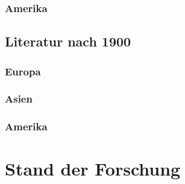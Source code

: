 \documentclass[12pt,ngerman,parskip=half]{scrreprt}
\begin{document}
\subsubsection{Amerika}

\blindtext 

\blindtext

\blindtext

\subsection{Literatur nach 1900}

\subsubsection{Europa}

\blindtext 

\blindtext

\blindtext

\subsubsection{Asien}

\blindtext 

\blindtext

\blindtext

\subsubsection{Amerika}

\blindtext[3]

\blindtext[3]

\blindtext[3]


\section{Stand der Forschung}

\blindtext 

\blindtext

\blindtext
\end{document}
